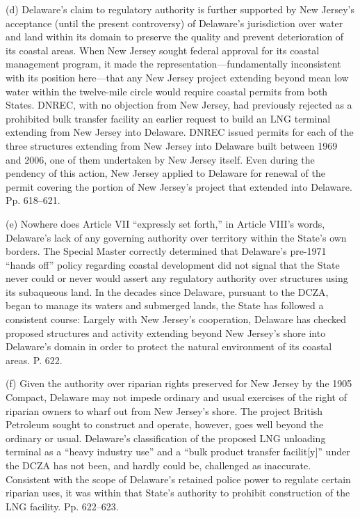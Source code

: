   (d) Delaware's claim to regulatory authority is further supported
by New Jersey's acceptance (until the present controversy) of
Delaware's jurisdiction over water and land within its domain to
preserve the quality and prevent deterioration of its coastal areas.
When New Jersey sought federal approval for its coastal management
program, it made the representation---fundamentally inconsistent with
its position here---that any New Jersey project extending beyond
mean low water within the twelve-mile circle would require coastal
permits from both States. DNREC, with no objection from New Jersey,
had previously rejected as a prohibited bulk transfer facility an
earlier request to build an LNG terminal extending from New Jersey
into Delaware. DNREC issued permits for each of the three structures
extending from New Jersey into Delaware built between 1969 and 2006, one
of them undertaken by New Jersey itself. Even during the pendency of
this action, New Jersey applied to Delaware for renewal of the permit
covering the portion of New Jersey's project that extended into
Delaware. Pp. 618--621.

  (e) Nowhere does Article VII ``expressly set forth,'' in Article
VIII's words, Delaware's lack of any governing authority over
territory within the State's own borders. The Special Master correctly
determined that Delaware's pre-1971 ``hands off'' policy regarding
coastal development did not signal that the State never could or
never would assert any regulatory authority over structures using
its subaqueous land. In the decades since Delaware, pursuant to the
DCZA, began to manage its waters and submerged lands, the State has
followed a consistent course: Largely with New Jersey's cooperation,
Delaware has checked proposed structures and activity extending beyond
New Jersey's shore into Delaware's domain in order to protect the
natural environment of its coastal areas. P. 622.

  (f) Given the authority over riparian rights preserved for New
Jersey by the 1905 Compact, Delaware may not impede ordinary and
usual exercises of the right of riparian owners to wharf out from New
Jersey's shore. The project British Petroleum sought to construct
and operate, \newpage  however, goes well beyond the ordinary or usual.
Delaware's classification of the proposed LNG unloading terminal as a
``heavy industry use'' and a ``bulk product transfer facilit[y]''
under the DCZA has not been, and hardly could be, challenged as
inaccurate. Consistent with the scope of Delaware's retained
police power to regulate certain riparian uses, it was within that
State's authority to prohibit construction of the LNG facility. Pp.
622--623.


